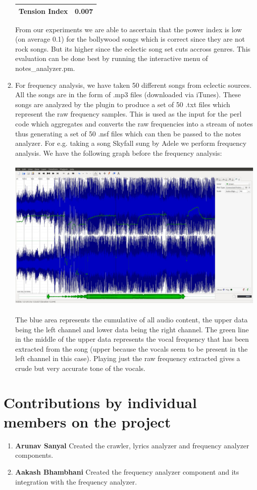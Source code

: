 \documentclass[letterpaper, 11pt]{article}
\begin{document}
\begin{enumerate}
\begin{center}
\begin{tabular}{ |c|c| }
 Tension Index & 0.007\\ 
 \hline
\end{tabular}
\end{center}
From our experiments we are able to ascertain that the power index is low (on average 0.1) for the bollywood songs which is correct since they are not rock songs. But its higher since the eclectic song set cuts accross genres. This evaluation can be done best by running the interactive menu of notes\_analyzer.pm.
\item For frequency analysis, we have taken 50 different songs from eclectic sources. All the songs are in the form of .mp3 files (downloaded via iTunes). These songs are analyzed by the plugin to produce a set of 50 .txt files which represent the raw frequency samples. This is used as the input for the perl code which aggregates and converts the raw frequencies into a stream of notes thus generating a set of 50 .nsf files which can then be passed to the notes analyzer. For e.g. taking a song Skyfall sung by Adele we perform frequency analysis. We have the following graph before the frequency analysis:\\\\
\includegraphics[width=\textwidth]{after.jpg}\\\\
The blue area represents the cumulative of all audio content, the upper data being the left channel and lower data being the right channel. The green line in the middle of the upper data represents the vocal frequency that has been extracted from the song (upper because the vocals seem to be present in the left channel in this case). Playing just the raw frequency extracted gives a crude but very accurate tone of the vocals.
\end{enumerate}

\section*{Contributions by individual members on the project}
\begin{enumerate}
\item \textbf{Arunav Sanyal} Created the crawler, lyrics analyzer and frequency analyzer components.
\item \textbf{Aakash Bhambhani} Created the frequency analyzer component and its integration with the frequency analyzer.  
\end{enumerate}
\end{document}
